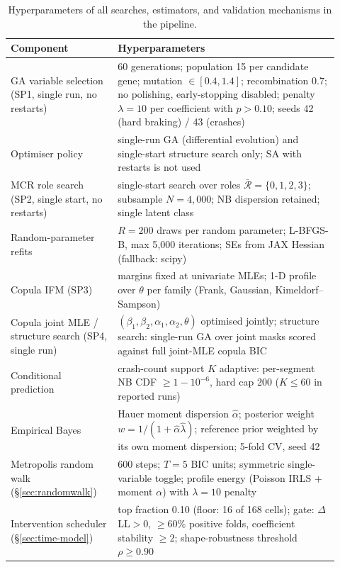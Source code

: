 \documentclass[letterpaper,8pt]{extarticle}  %
\begin{document}
\begin{doublespacing}
\begin{linenumbers}
\begin{table}[!ht]
  \footnotesize
  \caption{Hyperparameters of all searches, estimators, and validation mechanisms in the pipeline.}\label{tab:hyperparams}
  \begin{center}
    \begin{tabular}{p{0.30\linewidth}p{0.62\linewidth}}
      \toprule
      Component & Hyperparameters \\
      \midrule
      GA variable selection (SP1, single run, no restarts) & 60 generations; population 15 per candidate gene; mutation $\in[0.4,1.4]$; recombination 0.7; no polishing, early-stopping disabled; penalty $\lambda=10$ per coefficient with $p>0.10$; seeds 42 (hard braking) / 43 (crashes) \\
      Optimiser policy & single-run GA (differential evolution) and single-start structure search only; SA with restarts is not used \\
      MCR role search (SP2, single start, no restarts) & single-start search over roles $\bar{\mathcal{R}}=\{0,1,2,3\}$; subsample $N=4{,}000$; NB dispersion retained; single latent class \\
      Random-parameter refits & $R=200$ draws per random parameter; L-BFGS-B, max 5{,}000 iterations; SEs from JAX Hessian (fallback: scipy) \\
      Copula IFM (SP3) & margins fixed at univariate MLEs; 1-D profile over $\theta$ per family (Frank, Gaussian, Kimeldorf--Sampson) \\
      Copula joint MLE / structure search (SP4, single run) & $(\beta_1,\beta_2,\alpha_1,\alpha_2,\theta)$ optimised jointly; structure search: single-run GA over joint masks scored against full joint-MLE copula BIC \\
      Conditional prediction & crash-count support $K$ adaptive: per-segment NB CDF $\geq 1-10^{-6}$, hard cap 200 ($K\leq60$ in reported runs) \\
      Empirical Bayes & Hauer moment dispersion $\hat\alpha$; posterior weight $w=1/(1+\hat\alpha\hat\lambda)$; reference prior weighted by its own moment dispersion; 5-fold CV, seed 42 \\
      Metropolis random walk (\S\ref{sec:randomwalk}) & 600 steps; $T=5$ BIC units; symmetric single-variable toggle; profile energy (Poisson IRLS + moment $\alpha$) with $\lambda=10$ penalty \\
      Intervention scheduler (\S\ref{sec:time-model}) & top fraction 0.10 (floor: 16 of 168 cells); gate: $\Delta$LL$>0$, $\geq60\%$ positive folds, coefficient stability $\geq2$; shape-robustness threshold $\rho\geq0.90$ \\
      \bottomrule
    \end{tabular}
  \end{center}
\end{table}


\end{linenumbers}
\end{doublespacing}
\end{document}
